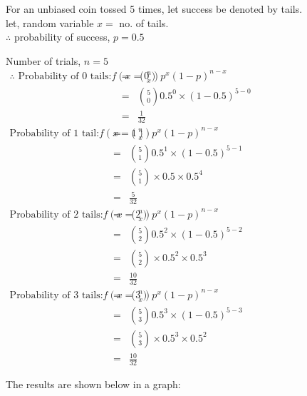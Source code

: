 \documentclass{article}
\begin{document}
\Large{
    For an unbiased coin tossed 5 times, let success be denoted by tails.\\
    let, random variable $x=$ no. of tails.\\
    $\therefore$ probability of success, $p = 0.5$

    \hspace{1em}Number of trials, $n=5$ \\
    \begin{eqnarray*}
        \text{$\therefore$ Probability of 0 tails:} f(x=0) &=& {n \choose x} p^x(1-p)^{n-x}\hspace{10cm}\\
        &=& {5 \choose 0} 0.5^0 \times (1-0.5)^{5-0}\\
        &=& \frac{1}{32}
    \end{eqnarray*}
    \begin{eqnarray*}
        \text{Probability of 1 tail:} f(x=1) &=& {n \choose x} p^x(1-p)^{n-x}\hspace{10cm}\\
        &=& {5 \choose 1} 0.5^1 \times (1-0.5)^{5-1}\\
        &=& {5 \choose 1} \times 0.5 \times 0.5^4\\
        &=& \frac{5}{32}
    \end{eqnarray*}
    \begin{eqnarray*}
        \text{Probability of 2 tails:} f(x=2) &=& {n \choose x} p^x(1-p)^{n-x}\hspace{10cm}\\
        &=& {5 \choose 2} 0.5^2 \times (1-0.5)^{5-2}\\
        &=& {5 \choose 2} \times 0.5^2 \times 0.5^3\\
        &=& \frac{10}{32}
    \end{eqnarray*}
    \begin{eqnarray*}
        \text{Probability of 3 tails:} f(x=3) &=& {n \choose x} p^x(1-p)^{n-x}\hspace{10cm}\\
        &=& {5 \choose 3} 0.5^3 \times (1-0.5)^{5-3}\\
        &=& {5 \choose 3} \times 0.5^3 \times 0.5^2\\
        &=& \frac{10}{32}
    \end{eqnarray*}

    The results are shown below in a graph:


}
\end{document}
